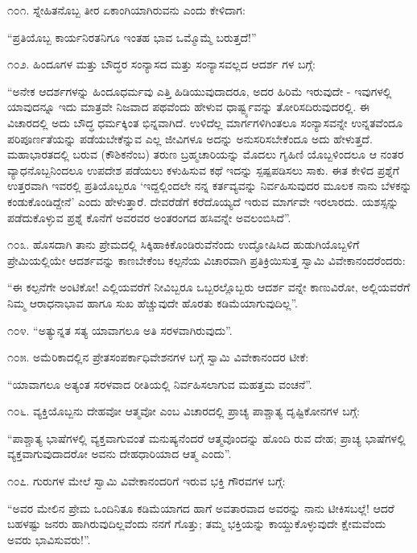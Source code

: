 ೧೦೧. ಸ್ನೇಹಿತನೊಬ್ಬ ತೀರ ಏಕಾಂಗಿಯಾಗಿರುವನು ಎಂದು ಕೇಳಿದಾಗ:

“ಪ್ರತಿಯೊಬ್ಬ ಕಾರ್ಯನಿರತನಿಗೂ ಇಂತಹ ಭಾವ ಒಮ್ಮೊಮ್ಮೆ ಬರುತ್ತದೆ!” 

೧೦೨. ಹಿಂದೂಗಳ ಮತ್ತು ಬೌದ್ಧರ ಸಂನ್ಯಾಸದ ಮತ್ತು ಸಂನ್ಯಾಸವಲ್ಲದ ಆದರ್ಶ ಗಳ ಬಗ್ಗೆ:

“ಅನೇಕ ಆದರ್ಶಗಳನ್ನು ಹಿಂದೂಧರ್ಮವು ಎತ್ತಿ ಹಿಡಿಯುವುದಾದರೂ, ಅದರ ಹಿರಿಮೆ ಇರುವುದೇ - ಇವುಗಳಲ್ಲಿ ಯಾವುದನ್ನೂ ಇದು ಮಾತ್ರವೇ ನಿಜವಾದ ಪಥವೆಂದು ಹೇಳುವ ಧಾರ್ಷ್ಟ್ಯವನ್ನು ತೋರಿಸದಿರುವುದರಲ್ಲಿ. ಈ ವಿಚಾರದಲ್ಲಿ ಅದು ಬೌದ್ಧ ಧರ್ಮಕ್ಕಿಂತ ಭಿನ್ನವಾಗಿದೆ. ಉಳಿದೆಲ್ಲ ಮಾರ್ಗಗಳಿಗಿಂತಲೂ ಸಂನ್ಯಾಸವನ್ನೇ ಉನ್ನತವೆಂದೂ ಪರಿಪೂರ್ಣತೆಯನ್ನು ಪಡೆಯಬೇಕೆನ್ನುವ ಎಲ್ಲ ಜೀವಿಗಳೂ ಅದನ್ನು ಅನುಸರಿಸಬೇಕೆಂದೂ ಅದು ಹೇಳುತ್ತದೆ. ಮಹಾಭಾರತದಲ್ಲಿ ಬರುವ (ಕೌಶಿಕನೆಂಬ) ತರುಣ ಬ್ರಹ್ಮಚಾರಿಯನ್ನು ಮೊದಲು ಗೃಹಿಣಿ ಯೊಬ್ಬಳಿಂದಲೂ ಆ ನಂತರ ವ್ಯಾಧನೊಬ್ಬನಿಂದಲೂ ಉಪದೇಶ ಪಡೆಯಲು ಕಳುಹಿಸುವ ಕಥೆ ಇದನ್ನು ಸ್ಪಷ್ಪಪಡಿಸಲು ಸಾಕು. ಈತ ಕೇಳಿದ ಪ್ರಶ್ನೆಗೆ ಉತ್ತರವಾಗಿ ಇವರಲ್ಲಿ ಪ್ರತಿಯೊಬ್ಬರೂ ‘ಇದ್ದಲ್ಲಿಂದಲೇ ನನ್ನ ಕರ್ತವ್ಯವನ್ನು ನಿರ್ವಹಿಸುವುದರ ಮೂಲಕ ನಾನು ಬೆಳಕನ್ನು ಕಂಡುಕೊಂಡಿದ್ದೇನೆ’ ಎಂದು ಹೇಳುತ್ತಾರೆ. ದೇವರೆಡೆಗೆ ಕರೆದೊಯ್ಯದೆ ಇರುವ ಮಾರ್ಗವೇ ಇರಲಾರದು. ಯಶಸ್ಸನ್ನು ಪಡೆದುಕೊಳ್ಳುವ ಪ್ರಶ್ನೆ ಕೊನೆಗೆ ಅವರವರ ಅಂತರಂಗದ ಹಸಿವನ್ನೇ ಅವಲಂಬಿಸಿದೆ”. 

೧೦೩. ಹೊಸದಾಗಿ ತಾನು ಪ್ರೇಮದಲ್ಲಿ ಸಿಕ್ಕಿಹಾಕಿಕೊಂಡಿರುವೆನೆಂದು ಉದ್ಘೋಷಿಸಿದ ಹುಡುಗಿಯೊಬ್ಬಳಿಗೆ ಪ್ರೇಮಿಯಲ್ಲಿಯೇ ಆದರ್ಶವನ್ನು ಕಾಣಬೇಕೆಂಬ ಕಲ್ಪನೆಯ ವಿಚಾರವಾಗಿ ಪ್ರತಿಕ್ರಿಯಿಸುತ್ತ ಸ್ವಾಮಿ ವಿವೇಕಾನಂದರೆಂದರು:

“ಈ ಕಲ್ಪನೆಗೇ ಅಂಟಿಕೋ! ಎಲ್ಲಿಯವರೆಗೆ ನೀವಿಬ್ಬರೂ ಒಬ್ಬರಲ್ಲೊಬ್ಬರು ಆದರ್ಶ ವನ್ನೇ ಕಾಣುವಿರೋ, ಅಲ್ಲಿಯವರೆಗೆ ನಿಮ್ಮ ಆರಾಧನಾಭಾವ ಹಾಗೂ ಸುಖ ಹೆಚ್ಚುವುದೇ ಹೊರತು ಕಡಿಮೆಯಾಗುವುದಿಲ್ಲ”. 

೧೦೪. “ಅತ್ಯುನ್ನತ ಸತ್ಯ ಯಾವಾಗಲೂ ಅತಿ ಸರಳವಾಗಿರುವುದು”. 

೧೦೫. ಅಮೆರಿಕಾದಲ್ಲಿನ ಪ್ರೇತಸಂಪರ್ಕಾಧಿವೇಶನಗಳ ಬಗ್ಗೆ ಸ್ವಾಮಿ ವಿವೇಕಾನಂದರ ಟೀಕೆ:

“ಯಾವಾಗಲೂ ಅತ್ಯಂತ ಸರಳವಾದ ರೀತಿಯಲ್ಲಿ ನಿರ್ವಹಿಸಲಾಗುವ ಮಹತ್ತಮ ವಂಚನೆ”. 

೧೦೬. ವ್ಯಕ್ತಿಯೊಬ್ಬನು ದೇಹವೋ ಆತ್ಮವೋ ಎಂಬ ವಿಚಾರದಲ್ಲಿ ಪ್ರಾಚ್ಯ ಪಾಶ್ಚಾತ್ಯ ದೃಷ್ಟಿಕೋನಗಳ ಬಗ್ಗೆ:

“ಪಾಶ್ಚಾತ್ಯ ಭಾಷೆಗಳಲ್ಲಿ ವ್ಯಕ್ತವಾಗುವಂತೆ ಮನುಷ್ಯನೆಂದರೆ ಆತ್ಮವೊಂದನ್ನು ಹೊಂದಿ ರುವ ದೇಹ; ಪ್ರಾಚ್ಯ ಭಾಷೆಗಳಲ್ಲಿ ವ್ಯಕ್ತವಾಗುವುದಾದರೋ ಅವನು ದೇಹಧಾರಿಯಾದ ಆತ್ಮ ಎಂದು”. 

೧೦೭. ಗುರುಗಳ ಮೇಲೆ ಸ್ವಾಮಿ ವಿವೇಕಾನಂದರಿಗೆ ಇರುವ ಭಕ್ತಿ ಗೌರವಗಳ ಬಗ್ಗೆ:

“ಅವರ ಮೇಲಿನ ಪ್ರೇಮ ಒಂದಿನಿತೂ ಕಡಿಮೆಯಾಗದ ಹಾಗೆ ಅವತಾರವಾದ ಅವರನ್ನು ನಾನು ಟೀಕಿಸಬಲ್ಲೆ! ಆದರೆ ಬಹಳಷ್ಟು ಜನರು ಹಾಗಿರುವುದಿಲ್ಲವೆಂದು ನನಗೆ ಗೊತ್ತು; ತಮ್ಮ ಭಕ್ತಿಯನ್ನು ಕಾಯ್ದುಕೊಳ್ಳುವುದೇ ಕ್ಷೇಮವೆಂದು ಅವರು ಭಾವಿಸುವರು!”. 

